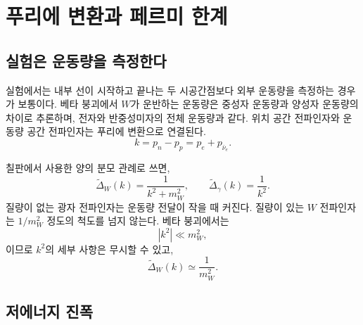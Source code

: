 \section{푸리에 변환과 페르미 한계}

\subsection{실험은 운동량을 측정한다}

실험에서는 내부 선이 시작하고 끝나는 두 시공간점보다 외부 운동량을 측정하는 경우가 보통이다. 베타 붕괴에서 \(W\)가 운반하는 운동량은 중성자 운동량과 양성자 운동량의 차이로 추론하며, 전자와 반중성미자의 전체 운동량과 같다. 위치 공간 전파인자와 운동량 공간 전파인자는 푸리에 변환으로 연결된다.
\begin{equation}
  k=p_n-p_p=p_e+p_{\bar\nu_e}.
\end{equation}

칠판에서 사용한 양의 분모 관례로 쓰면,
\begin{equation}
  \widetilde{\Delta}_W(k)=\frac1{k^2+m_W^2},
  \qquad
  \widetilde{\Delta}_\gamma(k)=\frac1{k^2}.
\end{equation}
질량이 없는 광자 전파인자는 운동량 전달이 작을 때 커진다. 질량이 있는 \(W\) 전파인자는 \(1/m_W^2\) 정도의 척도를 넘지 않는다. 베타 붕괴에서는
\begin{equation}
  |k^2|\ll m_W^2,
\end{equation}
이므로 \(k^2\)의 세부 사항은 무시할 수 있고,
\begin{equation}
  \widetilde{\Delta}_W(k)\simeq\frac1{m_W^2}.
\end{equation}

\begin{classroomqa}\end{classroomqa}

\subsection{저에너지 진폭}

